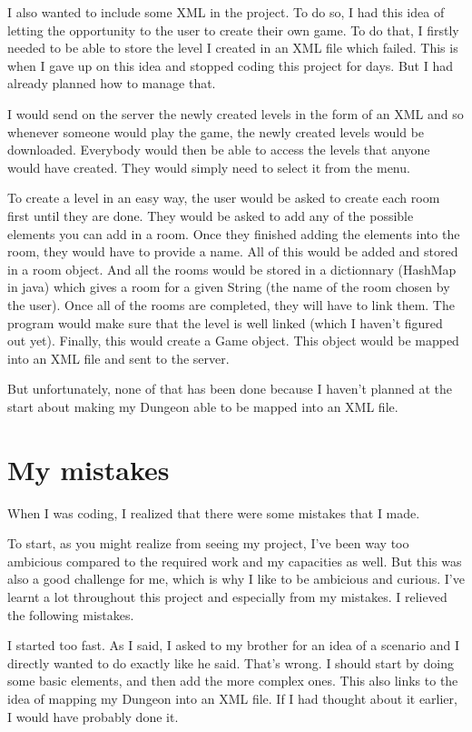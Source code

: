 \documentclass[11pt]{extarticle}
\begin{document}
I also wanted to include some XML in the project. To do so, I had this idea of letting the opportunity to the user to create their own game. To do that, I firstly needed to be able to store the level I created in an XML file which failed. This is when I gave up on this idea and stopped coding this project for days. But I had already planned how to manage that.

I would send on the server the newly created levels in the form of an XML and so whenever someone would play the game, the newly created levels would be downloaded. Everybody would then be able to access the levels that anyone would have created. They would simply need to select it from the menu. 

To create a level in an easy way, the user would be asked to create each room first until they are done. They would be asked to add any of the possible elements you can add in a room. Once they finished adding the elements into the room, they would have to provide a name. All of this would be added and stored in a room object. And all the rooms would be stored in a dictionnary (HashMap in java) which gives a room for a given String (the name of the room chosen by the user). Once all of the rooms are completed, they will have to link them. The program would make sure that the level is well linked (which I haven't figured out yet). Finally, this would create a Game object. This object would be mapped into an XML file and sent to the server.

But unfortunately, none of that has been done because I haven't planned at the start about making my Dungeon able to be mapped into an XML file. 

\section{My mistakes}

When I was coding, I realized that there were some mistakes that I made. 

To start, as you might realize from seeing my project, I've been way too ambicious compared to the required work and my capacities as well. But this was also a good challenge for me, which is why I like to be ambicious and curious. I've learnt a lot throughout this project and especially from my mistakes. I relieved the following mistakes.
 
I started too fast. As I said, I asked to my brother for an idea of a scenario and I directly wanted to do exactly like he said. That's wrong. I should start by doing some basic elements, and then add the more complex ones. This also links to the idea of mapping my Dungeon into an XML file. If I had thought about it earlier, I would have probably done it. 
\end{document}
